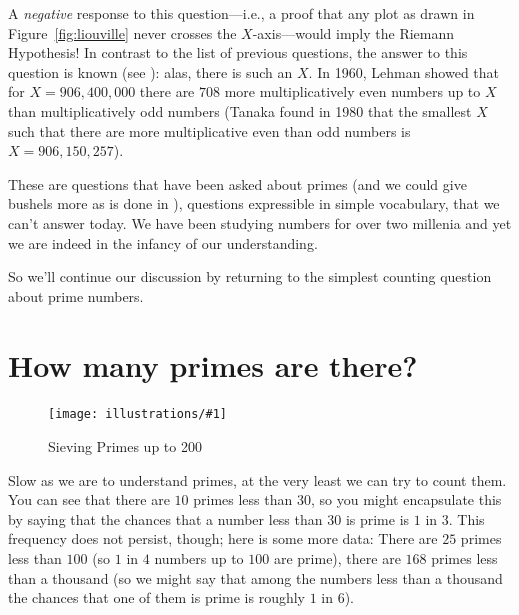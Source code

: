 \documentclass[openany]{book}
\newcommand{\ill}[3]{%
   \begin{figure}[H]%
   \vspace{-2ex}
   \centering%
   \texttt{[image: illustrations/\#1]}%
   \caption{#3}%
   \vspace{-2ex}
    \end{figure}}
\theoremstyle{plain}
\theoremstyle{definition}
\begin{document}
A {\em negative} response to this question---i.e., a proof that any
plot as drawn in Figure~\ref{fig:liouville} never crosses 
the $X$-axis---would imply the Riemann Hypothesis!  In contrast to the list of
previous questions, the answer to this question is known (see ): alas, there is such an $X$.  In 1960, Lehman showed that
for $X=906,400,000$ there are $708$ more multiplicatively even numbers
up to $X$ than multiplicatively odd numbers (Tanaka found in 1980 that
the smallest $X$ such that there are more multiplicative even than odd
numbers is $X=906,150,257$).

These are questions that have been asked about primes (and we could
give bushels more as is done in ), 
questions expressible in simple vocabulary, that
we can't answer today. We have been studying numbers for over two
millenia and yet we are indeed in the infancy of our understanding.


So we'll continue our discussion by returning to the simplest counting
question about prime numbers.  
                           
\chapter{How many primes are there?}

\ill{sieve200}{.8}{Sieving Primes up to 200}
                                                      
Slow as we are to understand primes, at the very least we can try to
count them. You can see that there are $10$ primes less than $30$, so
you might encapsulate this by saying that the chances that a number
less than $30$ is prime is $1$ in $3$.  This frequency does not
persist, though; here is some more data: There are $25$ primes less
than $100$ (so $1$ in $4$ numbers up to $100$ are prime), there are
$168$ primes less than a thousand (so we might say that among the
numbers less than a thousand the chances that one of them is prime is
roughly $1$ in $6$).
                                                           
\end{document}

